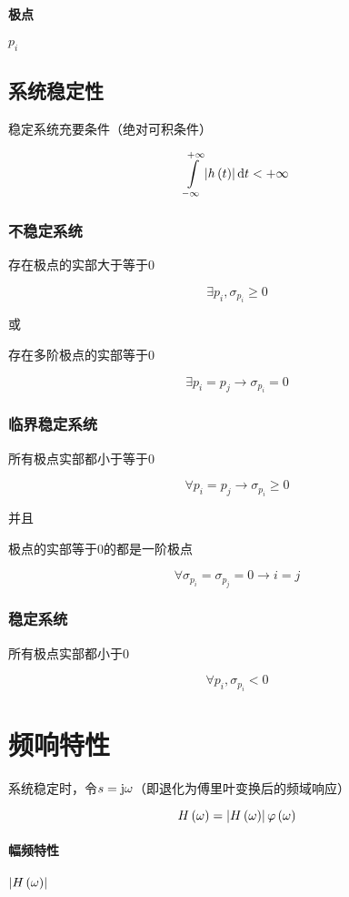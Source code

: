 \documentclass{article}
\begin{document}
\paragraph{极点}$p_i$

\subsection{系统稳定性}

稳定系统充要条件（绝对可积条件）

\[\impint\abs{h\pare{t}}\d t<+\infty\]

\subsubsection{不稳定系统}

存在极点的实部大于等于0

\[\exists p_i,\sigma_{p_i}\geqslant0\]

或

存在多阶极点的实部等于0

\[\exists p_i=p_j\to\sigma_{p_i}=0\]

\subsubsection{临界稳定系统}

所有极点实部都小于等于0

\[\forall p_i=p_j\to\sigma_{p_i}\geqslant0\]

并且

极点的实部等于0的都是一阶极点

\[\forall\sigma_{p_i}=\sigma_{p_j}=0\to i=j\]

\subsubsection{稳定系统}

所有极点实部都小于0

\[\forall p_i,\sigma_{p_i}<0\]

\section{频响特性}

系统稳定时，令$s=\mathrm j\omega$（即退化为傅里叶变换后的频域响应）

\[H\left(\omega\right)=\left|H\left(\omega\right)\right|\varphi\left(\omega\right)\]

\paragraph{幅频特性}$\left|H\left(\omega\right)\right|$
\end{document}
